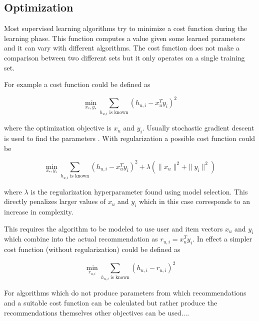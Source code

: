 
\subsection{Optimization}\label{sec:background:theory:opt}

Most supervised learning algorithms try to minimize a cost function during the learning phase. This function computes a value given some learned parameters and it can vary with different algorithms. The cost function does not make a comparison between two different sets but it only operates on a single training set.

For example a cost function could be defined as

\begin{equation}
    \min_{x_*, y_*} \sum_{h_{u,i} \text{ is known} } (h_{u, i} - x_{u}^T y_i)^2
\end{equation}

where the optimization objective is $x_u$ and $y_i$. Usually stochastic gradient descent is used to find the parameters \cite{hu2008collaborative}. With regularization a possible cost function could be

\begin{equation}
    \min_{x_*, y_*} \sum_{h_{u,i} \text{ is known} } (h_{u, i} - x_{u}^T y_i)^2 + \lambda(\|x_u\|^2 + \|y_i\|^2)
\end{equation}

where $\lambda$ is the regularization hyperparameter found using model selection. This directly penalizes larger values of $x_u$ and $y_i$ which in this case corresponds to an increase in complexity.

This requires the algorithm to be modeled to use user and item vectors $x_u$ and $y_i$ which combine into the actual recommendation as $r_{u, i} = x_u^T y_i$. In effect a simpler cost function (without regularization) could be defined as

\begin{equation}
    \min_{r_{u, i}} \sum_{h_{u,i} \text{ is known} } (h_{u, i} - r_{u, i})^2
\end{equation}


For algorithms which do not produce parameters from which recommendations and a suitable cost function can be calculated but rather produce the recommendations themselves other objectives can be used....

